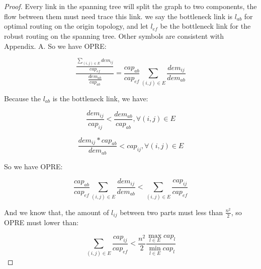 \documentclass[conference]{IEEEtran}
\begin{document}
\section{}
\begin{proof}
Every link in the spanning tree will split the graph to two components, the flow between them must need trace this link.
we say the bottleneck link is $l_{ab}$ for optimal routing on the origin topology, and let $l_{ef}$ be the bottleneck link for 
the robust routing on the spanning tree. Other symbols are consistent with Appendix. A. So we have OPRE:

\begin{equation}
    \frac{\frac{\sum_{(i,j) \in E} dem_{ij}}{cap_{ef}}}{\frac{dem_{ab}}{cap_{ab}}} = \frac{cap_{ab}}{cap_{ef}} \sum_{(i,j) \in E} \frac{dem_{ij}}{dem_{ab}}
\end{equation}

Because the $l_{ab}$ is the bottleneck link, we have:

\begin{equation}
    \frac{dem_{ij}}{cap_{ij}} < \frac{dem_{ab}}{cap_{ab}}, \forall (i,j) \in E
\end{equation}

\begin{equation}
    \frac{dem_{ij} * cap_{ab}}{dem_{ab}} < cap_{ij}, \forall (i,j) \in E
\end{equation}

So we have OPRE:

\begin{equation}
    \frac{cap_{ab}}{cap_{ef}} \sum_{(i,j) \in E} \frac{dem_{ij}}{dem_{ab}} < \sum_{(i,j) \in E} \frac{cap_{ij}}{cap_{ef}}
\end{equation}

And we know that, the amount of $l_{ij}$ between two parts must less than $\frac{n^2}{2}$, so OPRE must lower than:

\begin{equation}
    \sum_{(i,j) \in E} \frac{cap_{ij}}{cap_{ef}} < \frac{n^2}{2} \frac{\max_{l \in E} cap_l}{\min_{l \in E} cap_l}
\end{equation}

\end{proof}

\end{document}
